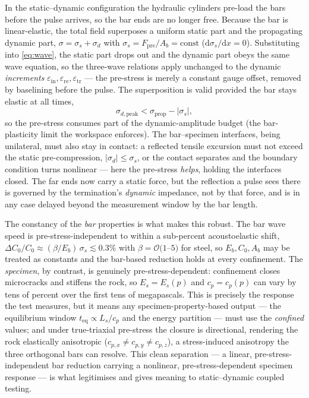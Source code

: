 \documentclass[sn-basic]{sn-jnl}
\newcommand{\eps}{\varepsilon}
\begin{document}
In the static--dynamic configuration the hydraulic cylinders pre-load the bars
before the pulse arrives, so the bar ends are no longer free. Because the bar is
linear-elastic, the total field superposes a uniform static part and the
propagating dynamic part, $\sigma=\sigma_s+\sigma_d$ with
$\sigma_s=F_{\mathrm{pre}}/A_b=\mathrm{const}$ ($\mathrm{d}\sigma_s/\mathrm{d}x=0$).
Substituting into \eqref{eq:wave}, the static part drops out and the dynamic part
obeys the same wave equation, so the three-wave relations apply unchanged to the
dynamic \emph{increments} $\eps_{\mathrm{in}},\eps_{\mathrm{re}},\eps_{\mathrm{tr}}$
--- the pre-stress is merely a constant gauge offset, removed by baselining before
the pulse. The superposition is valid provided the bar stays elastic at all times,
\begin{equation}
\sigma_{d,\mathrm{peak}}<\sigma_{\mathrm{prop}}-|\sigma_s|,
\label{eq:budget}
\end{equation}
so the pre-stress consumes part of the dynamic-amplitude budget (the bar-plasticity
limit the workspace enforces). The bar--specimen interfaces, being unilateral, must
also stay in contact: a reflected tensile excursion must not exceed the static
pre-compression, $|\sigma_d|\le\sigma_s$, or the contact separates and the boundary
condition turns nonlinear --- here the pre-stress \emph{helps}, holding the
interfaces closed. The far ends now carry a static force, but the reflection a pulse
sees there is governed by the termination's \emph{dynamic} impedance, not by that
force, and is in any case delayed beyond the measurement window by the bar length.

The constancy of the \emph{bar} properties is what makes this robust. The bar wave
speed is pre-stress-independent to within a sub-percent acoustoelastic shift,
$\Delta C_0/C_0\approx(\beta/E_b)\,\sigma_s\lesssim0.3\%$ with
$\beta=\mathcal{O}(1$--$5)$ for steel, so $E_b,C_0,A_b$ may be treated as constants
and the bar-based reduction holds at every confinement. The \emph{specimen}, by
contrast, is genuinely pre-stress-dependent: confinement closes microcracks and
stiffens the rock, so $E_s=E_s(p)$ and $c_p=c_p(p)$ can vary by tens of percent
over the first tens of megapascals. This is precisely the response the test
measures, but it means any specimen-property-based output --- the equilibrium window
$t_{\mathrm{eq}}\propto L_s/c_p$ and the energy partition --- must
use the \emph{confined} values; and under true-triaxial pre-stress the closure is
directional, rendering the rock elastically anisotropic
($c_{p,x}\neq c_{p,y}\neq c_{p,z}$), a stress-induced anisotropy the three
orthogonal bars can resolve. This clean separation --- a linear,
pre-stress-independent bar reduction carrying a nonlinear, pre-stress-dependent
specimen response --- is what legitimises and gives meaning to static--dynamic
coupled testing.
\end{document}
